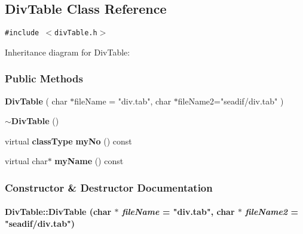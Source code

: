 \subsection{Div\-Table  Class Reference}
\label{DivTable}
{\tt \#include $<$div\-Table.h$>$}

Inheritance diagram for Div\-Table:\begin{figure}[H]
\begin{center}
\leavevmode
\setlength{\epsfysize}{6cm}
\end{center}
\end{figure}
\subsubsection*{Public Methods}
\begin{CompactItemize}
\item 
{\bf Div\-Table} ( char $\ast$file\-Name = "div.tab", char $\ast$file\-Name2="seadif/div.tab" )
\item 
{\bf $\sim$Div\-Table} ()
\item 
virtual {\bf class\-Type} {\bf my\-No} () const
\item 
virtual char$\ast$ {\bf my\-Name} () const
\end{CompactItemize}


\subsubsection{Constructor \& Destructor Documentation}
\label{DivTable_a0}
\paragraph{\setlength{\rightskip}{0pt plus 5cm}Div\-Table::Div\-Table (char $\ast$ {\em file\-Name} = "div.tab", char $\ast$ {\em file\-Name2} = "seadif/div.tab")}\hfill



